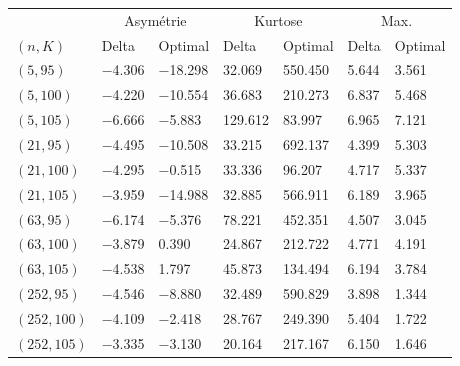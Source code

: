\begin{tabular}{lllllll}
\toprule
& \multicolumn{2}{c}{Asymétrie} & \multicolumn{2}{c}{Kurtose} & \multicolumn{2}{c}{Max.}\\
$(n,K)$& Delta & Optimal & Delta & Optimal & Delta & Optimal\\
\midrule
$(5,95)$ & \num{-4.306} & \num{-18.298} & \num{32.069} & \num{550.450} & \num{5.644} & \num{3.561}\\
$(5,100)$ & \num{-4.220} & \num{-10.554} & \num{36.683} & \num{210.273} & \num{6.837} & \num{5.468}\\
$(5,105)$ & \num{-6.666} & \num{-5.883} & \num{129.612} & \num{83.997} & \num{6.965} & \num{7.121}\\
$(21,95)$ & \num{-4.495} & \num{-10.508} & \num{33.215} & \num{692.137} & \num{4.399} & \num{5.303}\\
$(21,100)$ & \num{-4.295} & \num{-0.515} & \num{33.336} & \num{96.207} & \num{4.717} & \num{5.337}\\
$(21,105)$ & \num{-3.959} & \num{-14.988} & \num{32.885} & \num{566.911} & \num{6.189} & \num{3.965}\\
$(63,95)$ & \num{-6.174} & \num{-5.376} & \num{78.221} & \num{452.351} & \num{4.507} & \num{3.045}\\
$(63,100)$ & \num{-3.879} & \num{0.390} & \num{24.867} & \num{212.722} & \num{4.771} & \num{4.191}\\
$(63,105)$ & \num{-4.538} & \num{1.797} & \num{45.873} & \num{134.494} & \num{6.194} & \num{3.784}\\
$(252,95)$ & \num{-4.546} & \num{-8.880} & \num{32.489} & \num{590.829} & \num{3.898} & \num{1.344}\\
$(252,100)$ & \num{-4.109} & \num{-2.418} & \num{28.767} & \num{249.390} & \num{5.404} & \num{1.722}\\
$(252,105)$ & \num{-3.335} & \num{-3.130} & \num{20.164} & \num{217.167} & \num{6.150} & \num{1.646}\\
\bottomrule
\end{tabular}
\\[3em]
